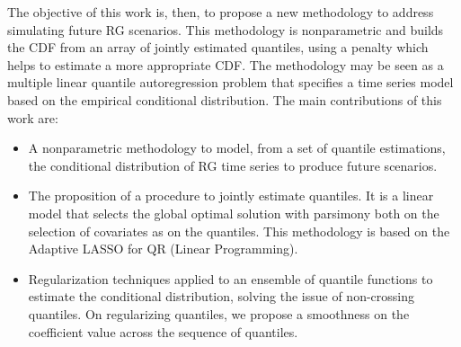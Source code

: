  
The objective of this work is, then, to propose a new methodology to address simulating future RG scenarios. This methodology is nonparametric and builds the CDF from an array of jointly estimated quantiles, using a penalty which helps to estimate a more appropriate CDF. The methodology may be seen as a multiple linear quantile autoregression problem that specifies a time series model based on the empirical conditional distribution. The main contributions of this work are:
\begin{itemize}
	\item A nonparametric methodology to model, from a set of quantile estimations, the conditional distribution of RG time series to produce future scenarios.
	
	\item The proposition of a procedure to jointly estimate quantiles. It is a linear model that selects the global optimal solution with parsimony both on the selection of covariates as on the quantiles. This methodology is based on the Adaptive LASSO for QR (Linear Programming). 
	
	\item Regularization techniques applied to an ensemble of quantile functions to estimate the conditional distribution, solving the issue of non-crossing quantiles. On regularizing quantiles, we propose a smoothness on the coefficient value across the sequence of quantiles.
	
\end{itemize}





